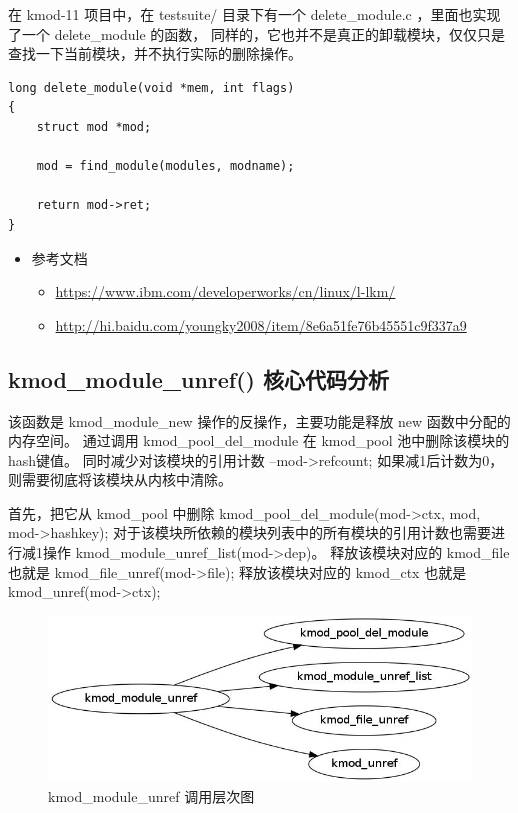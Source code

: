 在 kmod-11 项目中，在 testsuite/ 目录下有一个 delete\_module.c
，里面也实现了一个 delete\_module 的函数，
同样的，它也并不是真正的卸载模块，仅仅只是查找一下当前模块，并不执行实际的删除操作。

{\begin{shaded}\begin{verbatim}
long delete_module(void *mem, int flags)
{
    struct mod *mod;

    mod = find_module(modules, modname);

    return mod->ret;
}
\end{verbatim}\end{shaded}}
\begin{itemize}
\item
  参考文档
  \begin{itemize}
  \item
    \url{https://www.ibm.com/developerworks/cn/linux/l-lkm/}
  \item
    \url{http://hi.baidu.com/youngky2008/item/8e6a51fe76b45551c9f337a9}
  \end{itemize}
\end{itemize}
\subsection{kmod\_module\_unref() 核心代码分析}

该函数是 kmod\_module\_new 操作的反操作，主要功能是释放 new
函数中分配的内存空间。 通过调用 kmod\_pool\_del\_module 在 kmod\_pool
池中删除该模块的hash键值。 同时减少对该模块的引用计数
--mod-\textgreater{}refcount;
如果减1后计数为0，则需要彻底将该模块从内核中清除。

首先，把它从 kmod\_pool 中删除
kmod\_pool\_del\_module(mod-\textgreater{}ctx, mod,
mod-\textgreater{}hashkey);
对于该模块所依赖的模块列表中的所有模块的引用计数也需要进行减1操作
kmod\_module\_unref\_list(mod-\textgreater{}dep)。 释放该模块对应的
kmod\_file 也就是 kmod\_file\_unref(mod-\textgreater{}file);
释放该模块对应的 kmod\_ctx 也就是 kmod\_unref(mod-\textgreater{}ctx);

\begin{figure}[htbp]
\centering
\includegraphics{./figures/kmod_module_unref.jpg}
\caption{kmod\_module\_unref 调用层次图}
\end{figure}

